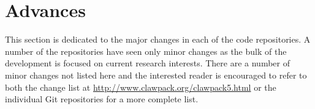 %
%
%

\section{Advances} \label{sec:advances}

This section is dedicated to the major changes in each of the code repositories.
A number of the repositories have seen only minor changes as the bulk of the
development is focused on current research interests.  There are a number of
minor changes not listed here and the interested reader is encouraged to refer
to both the change list at \url{http://www.clawpack.org/clawpack5.html} or the
individual \clawpack Git repositories for a more complete list.








